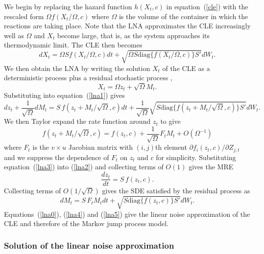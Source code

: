 \documentclass[12pt, DIV12]{scrartcl}
\begin{document}
We begin by replacing the hazard function $h(X_t,c)$ in equation~(\ref{cle})
with the rescaled form $\Omega f(X_t /\Omega,c)$ where $\Omega$ is the volume of
the container in which the reactions are taking place. Note that the LNA
approximates the CLE increasingly well as $\Omega$ and $X_t$ become large, that
is, as the system approaches its thermodynamic limit. The CLE then becomes
\begin{equation}\label{lna1}
d X_t = \Omega S f(X_t /\Omega,c)dt + \sqrt{\Omega S\textrm{diag}\{f(X_t /\Omega,c)\}S'}dW_t.
\end{equation}
We then obtain the LNA by writing the solution $X_t$ of the CLE as a
deterministic process plus a residual stochastic process \citep{kampen2001},
\begin{equation}\label{lna0}
X_t = \Omega z_{t}+\sqrt{\Omega}M_{t}.
\end{equation}
Substituting into equation~(\ref{lna1}) gives
\begin{equation}\label{lna2}
d z_{t}+\frac{1}{\sqrt{\Omega}}dM_{t} = S\, f(z_t+M_t /\sqrt{\Omega},c)dt + \frac{1}{\sqrt{\Omega}}\sqrt{S\textrm{diag}\{f(z_t+M_t /\sqrt{\Omega},c)\}S'}dW_t.
\end{equation}
We then Taylor expand the rate function around $z_t$ to give
\begin{equation}\label{lna3}
f(z_t+M_t /\sqrt{\Omega},c) = f(z_t,c)+\frac{1}{\sqrt{\Omega}}F_t M_t + O(\Omega^{-1})
\end{equation}
where $F_t$ is the $v\times u$ Jacobian matrix with $(i,j)$th element $\partial f_{i}(z_t,c) / \partial Z_{j,t}$ 
and we suppress the dependence of $F_t$ on $z_t$ and $c$ for simplicity. 
Substituting equation~(\ref{lna3}) into (\ref{lna2}) and collecting terms of 
$O(1)$ gives the MRE
\begin{equation}\label{lna4}
\frac{dz_{t}}{dt}=S\,f(z_{t},c).
\end{equation}
Collecting terms of $O(1/\sqrt{\Omega})$ gives the SDE satisfied by the residual process as
\begin{equation}\label{lna5}
dM_{t}=S\, F_t M_t dt + \sqrt{S\textrm{diag}\{f(z_t,c)\}S'}dW_t .
\end{equation}
Equations~(\ref{lna0}), (\ref{lna4}) and (\ref{lna5}) give the linear noise
approximation of the CLE and therefore of the Markov jump process model.


\subsubsection{Solution of the linear noise approximation}
\end{document}
